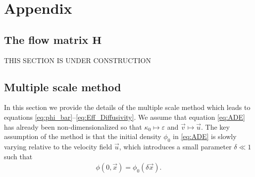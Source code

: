 \documentclass[11pt]{amsart}
\newcommand{\Hb}{\mathbf{H}}
\begin{document}

  \setcounter{equation}{1}  %
  \setcounter{section}{0}  %
  \renewcommand{\theequation}{A-\arabic{equation}} 
\renewcommand{\thesection}{A-\arabic{section}}
%
\section{Appendix} 
\label{sec:Appendix}
%
\subsection{The flow matrix $\Hb$}\label{eq:flow_matrix}
%
THIS SECTION IS UNDER CONSTRUCTION
%
\subsection{Multiple scale method}\label{sec:Multiscal_Method}
%
In this section we provide the details of the multiple scale method
\cite{McLaughlin:SIAM_JAM:780,Papanicolaou:1981:36:8,Papanicolaou:RF-835,Bensoussan:Book:1978}
which leads to equations
\eqref{eq:phi_bar}--\eqref{eq:Eff_Diffusivity}. We assume that
equation \eqref{eq:ADE} has already been non-dimensionalized so that
$\kappa_0\mapsto\varepsilon$ and $\vec{v}\mapsto\vec{u}$. The key assumption of the method is
that the initial density $\phi_0$ in \eqref{eq:ADE} is slowly
varying relative to the velocity field $\vec{u}$, which introduces a
small parameter $\delta\ll1$ such that  
% 
\begin{align}\label{eq:IC}
  \phi(0,\vec{x})=\phi_0(\delta\vec{x}).
\end{align}
%
\end{document}
